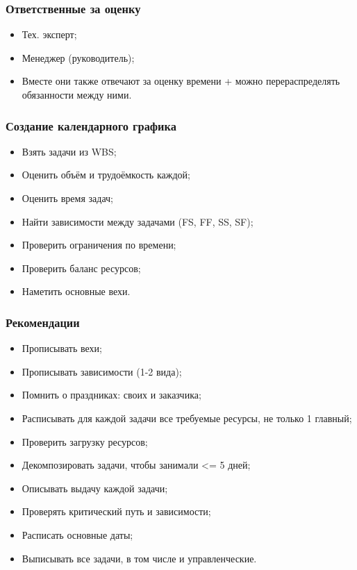 \documentclass[a4paper,8pt]{article}
\begin{document}
\subsubsection{Ответственные за оценку}

    \begin{itemize}
        \item Тех. эксперт;
        \item Менеджер (руководитель);
        \item Вместе они также отвечают за оценку времени + можно перераспределять обязанности между ними.
    \end{itemize}


\subsubsection{Создание календарного графика}

    \begin{itemize}
        \item Взять задачи из WBS;
        \item Оценить объём и трудоёмкость каждой;
        \item Оценить время задач;
        \item Найти зависимости между задачами (FS, FF, SS, SF);
        \item Проверить ограничения по времени;
        \item Проверить баланс ресурсов;
        \item Наметить основные вехи.
    \end{itemize}

\subsubsection{Рекомендации}


    \begin{itemize}
        \item Прописывать вехи;
        \item Прописывать зависимости (1-2 вида);
        \item Помнить о праздниках: своих и заказчика;
        \item Расписывать для каждой задачи все требуемые ресурсы, не только 1 главный;
        \item Проверить загрузку ресурсов;
        \item Декомпозировать задачи, чтобы занимали <= 5 дней;
        \item Описывать выдачу каждой задачи;
        \item Проверять критический путь и зависимости;
        \item Расписать основные даты;
        \item Выписывать все задачи, в том числе и управленческие.
    \end{itemize}
\end{document}
